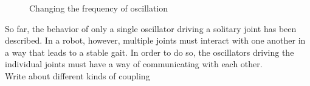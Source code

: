 \documentclass[12pt,twoside]{article}
\theoremstyle{plain}
\theoremstyle{definition}
\theoremstyle{remark}
\newcommand{\forceindent}{\leavevmode{\parindent=2em\indent}}
\begin{document}
\begin{figure}[htbp]
\centering     %
{}
\caption{Changing the frequency of oscillation}
\label{fig:change-freq}
\end{figure}


\forceindent So far, the behavior of only a single oscillator driving a solitary joint has been described. In a robot, however, multiple joints must interact with one another in a way that leads to a stable gait. In order to do so, the oscillators driving the individual joints must have a way of communicating with each other.\\

Write about different kinds of coupling
\end{document}
